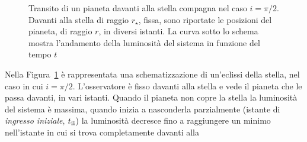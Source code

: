 \begin{figure}
  \centering
  \caption[Transito di un pianeta davanti alla stella compagna nel caso
  $i =
  \pi/2$]{Transito di un pianeta davanti alla stella compagna nel caso $i =
    \pi/2$. Davanti alla stella di raggio $r_\star$, fissa, sono riportate le
    posizioni del pianeta, di raggio $r$, in diversi istanti. La curva sotto lo
    schema mostra l'andamento della luminosità del sistema in funzione del tempo
    $t$}
  \label{fig:schema-transito}
\end{figure}
Nella Figura~\ref{fig:schema-transito} è rappresentata una schematizzazione di
un'eclissi della stella, nel caso in cui $i = \pi/2$. L'osservatore è fisso
davanti alla stella e vede il pianeta che le passa davanti, in vari
istanti. Quando il pianeta non copre la stella la luminosità del sistema è
massima, quando inizia a nasconderla parzialmente (istante di
\emph{ingresso iniziale}, $t_{\textup{ii}}$) la luminosità decresce fino a
raggiungere un minimo nell'istante in cui si trova completamente davanti alla
